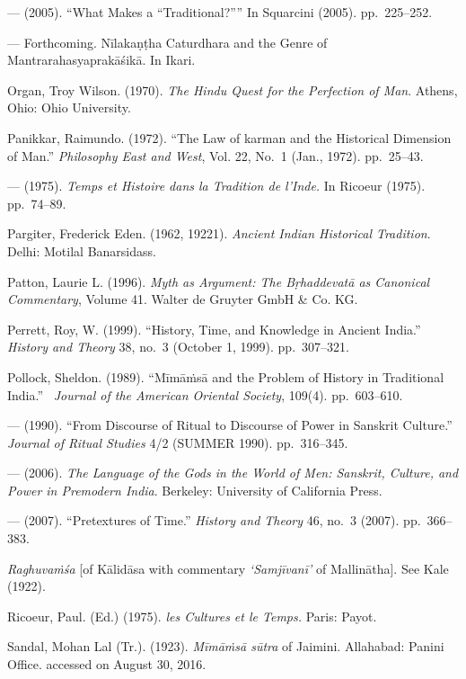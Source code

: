 \begin{thebibliography}{99}
  — (2005). “What Makes a “Traditional?”” In Squarcini (2005). pp.~225--252.

  — Forthcoming. Nīlakaṇṭha Caturdhara and the Genre of Mantrarahasyaprakāśikā. In Ikari.

  Organ, Troy Wilson. (1970). \textit{The Hindu Quest for the Perfection of Man}. Athens, Ohio: Ohio University.

  Panikkar, Raimundo. (1972). “The Law of karman and the Historical Dimension of Man.” \textit{Philosophy East and West}, Vol. 22, No.~1 (Jan., 1972). pp.~25--43.

  — (1975). \textit{Temps et Histoire dans la Tradition de l’Inde.} In Ricoeur (1975). pp.~74--89.

  Pargiter, Frederick Eden. (1962, 19221). \textit{Ancient Indian Historical Tradition}. Delhi: Motilal Banarsidass.

  Patton, Laurie L. (1996). \textit{Myth as Argument: The Bṛhaddevatā as Canonical Commentary}, Volume 41. Walter de Gruyter GmbH \& Co. KG.

  Perrett, Roy, W. (1999). “History, Time, and Knowledge in Ancient India.” \textit{History and Theory} 38, no.~3 (October 1, 1999). pp.~307--321.

  Pollock, Sheldon. (1989). “Mīmāṁsā and the Problem of History in Traditional India.”  \textit{Journal of the American Oriental Society}, 109(4). pp.~603--610.

  — (1990). “From Discourse of Ritual to Discourse of Power in Sanskrit Culture.” \textit{Journal of Ritual Studies} 4/2 (SUMMER 1990). pp.~316--345.

  — (2006). \textit{The Language of the Gods in the World of Men: Sanskrit, Culture, and Power in Premodern India}. Berkeley: University of California Press.

  — (2007). “Pretextures of Time.” \textit{History and Theory} 46, no.~3 (2007). pp.~366--383.

  \textit{Raghuvaṁśa} [of Kālidāsa with commentary \textit{‘Samjīvanī’} of Mallinātha]. See Kale (1922).

  Ricoeur, Paul. (Ed.) (1975). \textit{les Cultures et le Temps.} Paris: Payot.

  Sandal, Mohan Lal (Tr.). (1923). \textit{Mīmāṁsā sūtra} of Jaimini. Allahabad: Panini Office. accessed on August 30, 2016.


\end{thebibliography}
